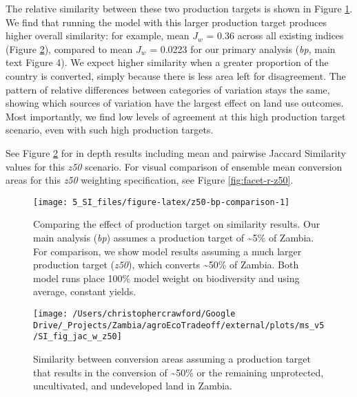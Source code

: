 \documentclass[
]{article}
\begin{document}
The relative similarity between these two production targets is shown in Figure \ref{fig:z50-bp-comparison}. We find that running the model with this larger production target produces higher overall similarity: for example, mean \(J_w\) = 0.36 across all existing indices (Figure \ref{fig:jac-w-z50}), compared to mean \(J_w\) = 0.0223 for our primary analysis (\emph{bp}, main text Figure 4). We expect higher similarity when a greater proportion of the country is converted, simply because there is less area left for disagreement. The pattern of relative differences between categories of variation stays the same, showing which sources of variation have the largest effect on land use outcomes. Most importantly, we find low levels of agreement at this high production target scenario, even with such high production targets.

See Figure \ref{fig:jac-w-z50} for in depth results including mean and pairwise Jaccard Similarity values for this \emph{z50} scenario. For visual comparison of ensemble mean conversion areas for this \emph{z50} weighting specification, see Figure \ref{fig:facet-r-z50}.



\begin{figure}
\texttt{[image: 5\_SI\_files/figure-latex/z50-bp-comparison-1]} \caption{Comparing the effect of production target on similarity results. Our main analysis (\emph{bp}) assumes a production target of \textasciitilde5\% of Zambia. For comparison, we show model results assuming a much larger production target (\emph{z50}), which converts \textasciitilde50\% of Zambia. Both model runs place 100\% model weight on biodiversity and using average, constant yields.}\label{fig:z50-bp-comparison}
\end{figure}



\begin{figure}
\texttt{[image: /Users/christophercrawford/Google Drive/\_Projects/Zambia/agroEcoTradeoff/external/plots/ms\_v5/SI\_fig\_jac\_w\_z50]} \caption{Similarity between conversion areas assuming a production target that results in the conversion of \textasciitilde50\% or the remaining unprotected, uncultivated, and undeveloped land in Zambia.}\label{fig:jac-w-z50}
\end{figure}
\end{document}
